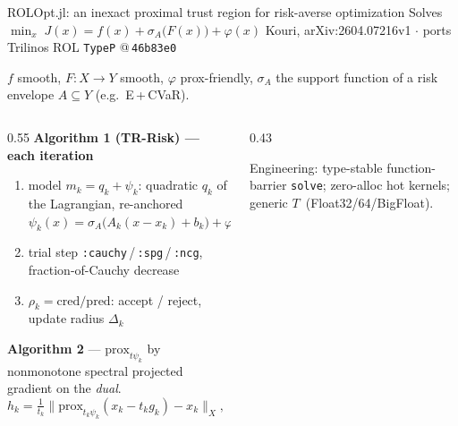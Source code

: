 \documentclass[aspectratio=169,10pt]{beamer}
\begin{document}
\begin{frame}{ROLOpt.jl: an inexact proximal trust region for risk-averse optimization}
  \small
  Solves \;$\displaystyle \min_x\; J(x)=f(x)+\sigma_A\!\big(F(x)\big)+\varphi(x)$
  \hfill{\tiny Kouri, arXiv:2604.07216v1 \;$\cdot$\; ports Trilinos ROL \texttt{TypeP} @\,\texttt{46b83e0}}

  \smallskip
  {\footnotesize $f$ smooth, $F:X\!\to\!Y$ smooth, $\varphi$ prox-friendly, $\sigma_A$ the support function of a risk envelope $A\subseteq Y$ (e.g.\ E\,+\,CVaR).}
  \medskip

  \begin{columns}[T]
  \begin{column}{0.55\textwidth}
   \textbf{Algorithm 1 (TR-Risk) --- each iteration}
   \begin{enumerate}\footnotesize\setlength\itemsep{2pt}
    \item model $m_k=q_k+\psi_k$: quadratic $q_k$ of the Lagrangian,
          re-anchored $\psi_k(x)=\sigma_A\!\big(A_k(x{-}x_k){+}b_k\big)+\varphi(x)$
    \item trial step \texttt{:cauchy}\,/\,\texttt{:spg}\,/\,\texttt{:ncg}, fraction-of-Cauchy decrease
    \item $\rho_k=\mathrm{cred}/\mathrm{pred}$: accept / reject, update radius $\Delta_k$
   \end{enumerate}
   \smallskip
   \textbf{Algorithm 2} --- $\mathrm{prox}_{t\psi_k}$ by nonmonotone spectral
   projected gradient on the \emph{dual}.
   \[\textstyle h_k=\tfrac1{t_k}\big\lVert \mathrm{prox}_{t_k\psi_k}(x_k-t_kg_k)-x_k\big\rVert_X,\quad \text{stop at } h_k\le 10^{-8}.\]
  \end{column}
  \begin{column}{0.43\textwidth}
   \centering

   \smallskip
   {\footnotesize\raggedright Engineering: type-stable function-barrier \texttt{solve};
   zero-alloc hot kernels; generic \mbox{$T$ (Float32/64/BigFloat)}.\par}
  \end{column}
  \end{columns}
\end{frame}
\end{document}
